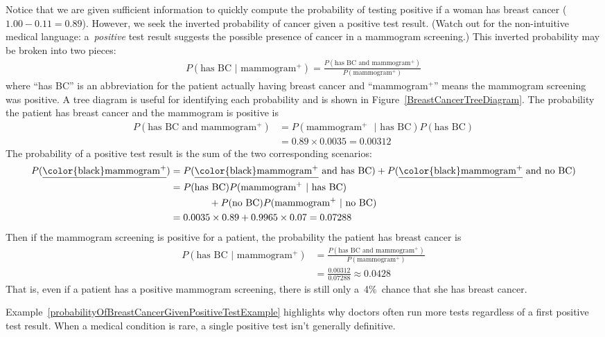 \begin{example}
Notice that we are given sufficient information to quickly compute the probability of testing positive if a woman has breast cancer ($1.00-0.11=0.89$). However, we seek the inverted probability of cancer given a positive test result. (Watch out for the non-intuitive medical language: a~\emph{positive} test result suggests the possible presence of cancer in a mammogram screening.) This inverted probability may be broken into two pieces:
\begin{align*}
P(\text{has BC } | \text{ mammogram$^+$}) = \frac{P(\text{has BC and mammogram$^+$})}{P(\text{mammogram$^+$})}
\end{align*}
where ``has BC'' is an abbreviation for the patient actually having breast cancer and ``mammogram$^+$'' means the mammogram screening was positive. A tree diagram is useful for identifying each probability and is shown in Figure~\ref{BreastCancerTreeDiagram}. The probability the patient has breast cancer and the mammogram is positive is
\begin{align*}
P(\text{has BC and mammogram$^+$}) &= P(\text{mammogram$^+$ } | \text{ has BC})P(\text{has BC}) \\
	&= 0.89\times 0.0035 = 0.00312
\end{align*}
The probability of a positive test result is the sum of the two corresponding scenarios:
\begin{align*}
P(\text{\underline{\color{black}mammogram$^+$}}) &= P(\text{\underline{\color{black}mammogram$^+$} and has BC}) + P(\text{\underline{\color{black}mammogram$^+$} and no BC}) \\
	&= P(\text{has BC})P(\text{mammogram$^+$ } | \text{ has BC}) \\
	&\qquad\qquad	+ P(\text{no BC})P(\text{mammogram$^+$ } | \text{ no BC}) \\
	&= 0.0035\times 0.89 + 0.9965\times 0.07 = 0.07288
\end{align*}
Then if the mammogram screening is positive for a patient, the probability the patient has breast cancer is
\begin{align*}
P(\text{has BC } | \text{ mammogram$^+$})
	&= \frac{P(\text{has BC and mammogram$^+$})}{P(\text{mammogram$^+$})}\\
	&= \frac{0.00312}{0.07288} \approx 0.0428
\end{align*}
That is, even if a patient has a positive mammogram screening, there is still only a~4\%~chance that she has breast cancer.
\end{example}

Example~\ref{probabilityOfBreastCancerGivenPositiveTestExample} highlights why doctors often run more tests regardless of a first positive test result. When a medical condition is rare, a single positive test isn't generally definitive.

